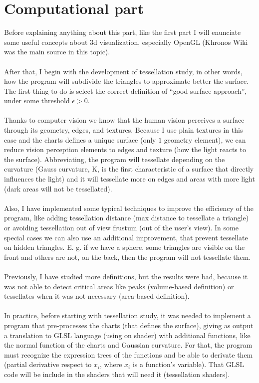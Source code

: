 \section*{Computational part}
Before explaining anything about this part, like the first part I will enunciate some useful concepts about $3$d visualization, especially OpenGL (Khronos Wiki \cite{KhronosWiki} was the main source in this topic).\\
\\After that, I begin with the development of tessellation study, in other words, how the program will subdivide the triangles to approximate better the surface. The first thing to do is select the correct definition of ``good surface approach'', under some threshold $\epsilon>0$.\\
\\Thanks to computer vision we know that the human vision perceives a surface through its geometry, edges, and textures. Because I use plain textures in this case and the charts defines a unique surface (only $1$ geometry element), we can reduce vision perception elements to edges and texture (how the light reacts to the surface). Abbreviating, the program will tessellate depending on the curvature (Gauss curvature, K, is the first characteristic of a surface that directly influences the light) and it will tessellate more on edges and areas with more light (dark areas will not be tessellated).\\
\\Also, I have implemented some typical techniques to improve the efficiency of the program, like adding tessellation distance (max distance to tessellate a triangle) or avoiding tessellation out of view frustum (out of the user's view). In some special cases we can also use an additional improvement, that prevent tessellate on hidden triangles. E. g. if we have a sphere, some triangles are visible on the front and others are not, on the back, then the program will not tessellate them.\\
\\Previously, I have studied more definitions, but the results were bad, because it was not able to detect critical areas like peaks (volume-based definition) or tessellates when it was not necessary (area-based definition).\\
\\In practice, before starting with tessellation study, it was needed to implement a program that pre-processes the charts (that defines the surface), giving as output a translation to GLSL language (using on shader) with additional functions, like the normal function of the charts and Gaussian curvature. For that, the program must recognize the expression trees of the functions and be able to derivate them (partial derivative respect to $x_i$, where $x_i$ is a function's variable). That GLSL code will be include in the shaders that will need it (tessellation shaders).\\
